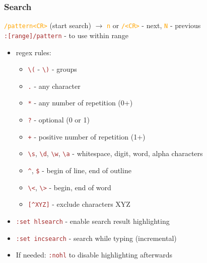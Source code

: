 \documentclass{beamer}
\newcommand{\vimnormal}[1]{\texttt{\textcolor{orange}{#1}}}
\newcommand{\vimcommand}[1]{\texttt{\textcolor{brown}{#1}}}
\newcommand{\vimkey}[1]{\textless{}#1\textgreater{}}
\begin{document}
\begin{frame}
    \frametitle{Search}
    \vimnormal{/pattern\vimkey{CR}} (start search) $\rightarrow$ \vimnormal{n} or \vimnormal{/\vimkey{CR}} - next, \vimnormal{N} - previous\\
    \vimcommand{:[range]/pattern} - to use within range
    \begin{itemize}
        \item regex rules:
        \begin{itemize}
            \item \vimcommand{\textbackslash{(}} - \vimcommand{\textbackslash{)}} - groups
            \item \vimcommand{.} - any character
            \item \vimcommand{*} - any number of repetition (0+)
            \item \vimcommand{?} - optional (0 or 1)
            \item \vimcommand{+} - positive number of repetition (1+)
            \item \vimcommand{\textbackslash{s}}, \vimcommand{\textbackslash{d}}, \vimcommand{\textbackslash{w}}, \vimcommand{\textbackslash{a}} - whitespace, digit, word, alpha characters
            \item \vimcommand{\string^}, \vimcommand{\$} - begin of line, end of outline
            \item \vimcommand{\textbackslash{\textless}}, \vimcommand{\textbackslash{\textgreater}} - begin, end of word
            \item \vimcommand{[\string^XYZ]} - exclude characters XYZ
        \end{itemize}
        \item \vimcommand{:set hlsearch} - enable search result highlighting
        \item \vimcommand{:set incsearch} - search while typing (incremental)
        \item If needed: \vimcommand{:nohl} to disable highlighting afterwards
    \end{itemize}
\end{frame}
\end{document}
